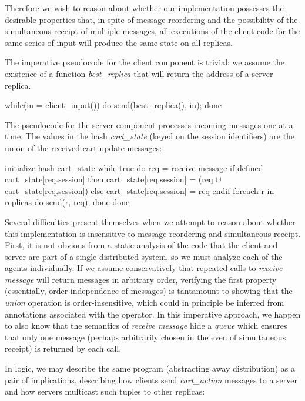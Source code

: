 Therefore we wish to reason about whether our implementation possesses the desirable 
properties that, in spite of message reordering and the possibility of the simultaneous
receipt of multiple messages, all executions of the client code for the same series of
input will produce the same state on all replicas.  

The imperative pseudocode for the client component is trivial: we assume the existence
of a function {\em best\_replica} that will return the address of a server replica.

\begin{Dedalus}
while(in = client_input()) do
  send(best_replica(), in);
done
\end{Dedalus}


The pseudocode for the server component processes incoming messages one
at a time.  The values in the hash {\em cart\_state} (keyed on the session identifiers) 
are the union of the received cart update messages:

\begin{Dedalus}
initialize hash cart_state
while true do
  req = receive message
  if defined cart_state[req.session] then
     cart_state[req.session] =  
       (req \(\cup\) cart_state[req.session]) 
  else 
    cart_state[req.session] = { req } 
  endif
  foreach r in replicas do
    send(r, req);
  done
done
\end{Dedalus}


Several difficulties present themselves when we attempt to reason about whether
this implementation is insensitive to message reordering and simultaneous receipt.
First, it is not obvious from a static analysis of the code that the client and server are
part of a single distributed system, so we must analyze each of the agents individually.
If we assume conservatively that repeated calls to {\em receive message} will return messages in
arbitrary order, verifying the first property (essentially, order-independence of messages)
is tantamount to showing that the {\em union} operation is
order-insensitive, which could in principle be inferred from annotations associated
with the operator.
In this imperative approach, we happen to also know that the semantics of {\em receive message}
hide a {\em queue} which ensures that only one message (perhaps arbitrarily chosen in the
even of simultaneous receipt) is returned by each call.


In logic, we may describe the same program (abstracting away distribution)
as a pair of implications, describing how clients send {\em cart\_action}
messages to a server and how servers multicast such tuples to other replicas:

